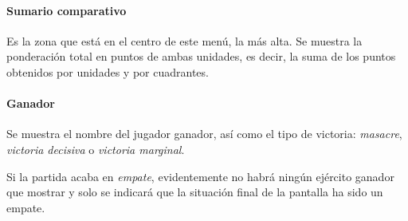 \paragraph{Sumario comparativo}
Es la zona que está en el centro de este menú, la más alta. Se muestra
la ponderación total en puntos de ambas unidades, es decir, la suma de
los puntos obtenidos por unidades y por cuadrantes.

\paragraph{Ganador}
Se muestra el nombre del jugador ganador, así como el tipo de
victoria: \emph{masacre}, \emph{victoria decisiva} o \emph{victoria
  marginal}.

Si la partida acaba en \emph{empate}, evidentemente no habrá ningún
ejército ganador que mostrar y solo se indicará que la situación final
de la pantalla ha sido un empate.